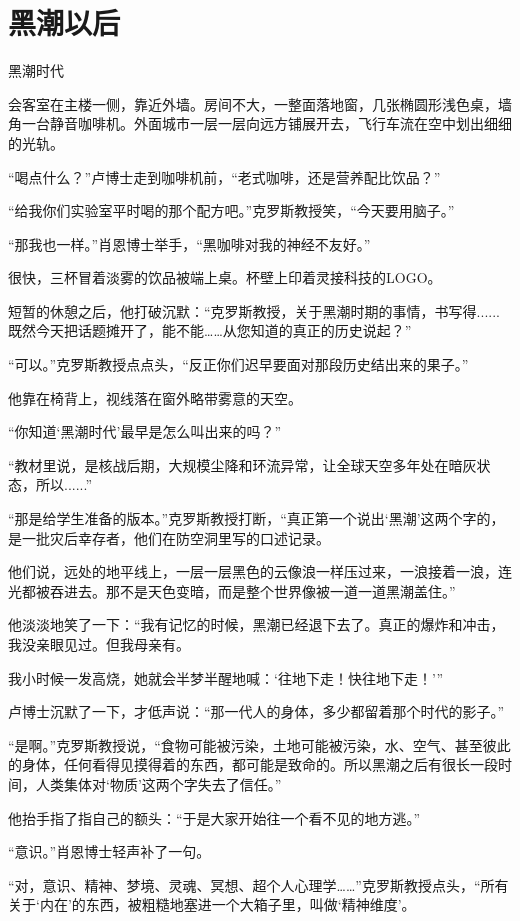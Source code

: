 \chapter{黑潮以后}

黑潮时代

会客室在主楼一侧，靠近外墙。房间不大，一整面落地窗，几张椭圆形浅色桌，墙角一台静音咖啡机。外面城市一层一层向远方铺展开去，飞行车流在空中划出细细的光轨。

“喝点什么？”卢博士走到咖啡机前，“老式咖啡，还是营养配比饮品？”

“给我你们实验室平时喝的那个配方吧。”克罗斯教授笑，“今天要用脑子。”

“那我也一样。”肖恩博士举手，“黑咖啡对我的神经不友好。”

很快，三杯冒着淡雾的饮品被端上桌。杯壁上印着灵接科技的LOGO。

短暂的休憩之后，他打破沉默：“克罗斯教授，关于黑潮时期的事情，书写得......既然今天把话题摊开了，能不能……从您知道的真正的历史说起？”

“可以。”克罗斯教授点点头，“反正你们迟早要面对那段历史结出来的果子。”

他靠在椅背上，视线落在窗外略带雾意的天空。

“你知道‘黑潮时代’最早是怎么叫出来的吗？”

“教材里说，是核战后期，大规模尘降和环流异常，让全球天空多年处在暗灰状态，所以......”

“那是给学生准备的版本。”克罗斯教授打断，“真正第一个说出‘黑潮’这两个字的，是一批灾后幸存者，他们在防空洞里写的口述记录。

他们说，远处的地平线上，一层一层黑色的云像浪一样压过来，一浪接着一浪，连光都被吞进去。那不是天色变暗，而是整个世界像被一道一道黑潮盖住。”

他淡淡地笑了一下：“我有记忆的时候，黑潮已经退下去了。真正的爆炸和冲击，我没亲眼见过。但我母亲有。

我小时候一发高烧，她就会半梦半醒地喊：‘往地下走！快往地下走！’”

卢博士沉默了一下，才低声说：“那一代人的身体，多少都留着那个时代的影子。”

“是啊。”克罗斯教授说，“食物可能被污染，土地可能被污染，水、空气、甚至彼此的身体，任何看得见摸得着的东西，都可能是致命的。所以黑潮之后有很长一段时间，人类集体对‘物质’这两个字失去了信任。”

他抬手指了指自己的额头：“于是大家开始往一个看不见的地方逃。”

“意识。”肖恩博士轻声补了一句。

“对，意识、精神、梦境、灵魂、冥想、超个人心理学……”克罗斯教授点头，“所有关于‘内在’的东西，被粗糙地塞进一个大箱子里，叫做‘精神维度’。

